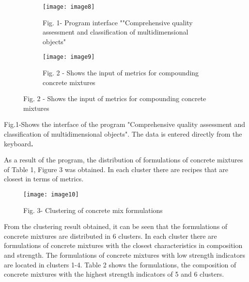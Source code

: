 \begin{figure}[H]
\centering
\begin{subfigure}[t]{0.45\textwidth}
  \centering
  \texttt{[image: image8]}
  \caption*{Fig. 1- Program interface ""Comprehensive quality assessment and
classification of multidimensional objects"}
\end{subfigure}
\hspace{0.05\textwidth}
\begin{subfigure}[t]{0.45\textwidth}
  \centering
  \texttt{[image: image9]}
  \caption*{Fig. 2 - Shows the input of metrics for compounding concrete mixtures}
\end{subfigure}
\end{figure}

Fig.1-Shows the interface of the program "Comprehensive quality
assessment and classification of multidimensional objects". The data is
entered directly from the keyboard{\bfseries .}

As a result of the program, the distribution of formulations of concrete
mixtures of Table 1, Figure 3 was obtained. In each cluster there are
recipes that are closest in terms of metrics.

\begin{figure}
  \centering
  \texttt{[image: image10]}
  \caption*{Fig. 3- Clustering of concrete mix formulations}
\end{figure}

From the clustering result obtained, it can be seen that the
formulations of concrete mixtures are distributed in 6 clusters. In each
cluster there are formulations of concrete mixtures with the closest
characteristics in composition and strength. The formulations of
concrete mixtures with low strength indicators are located in clusters
1-4. Table 2 shows the formulations, the composition of concrete
mixtures with the highest strength indicators of 5 and 6 clusters.

